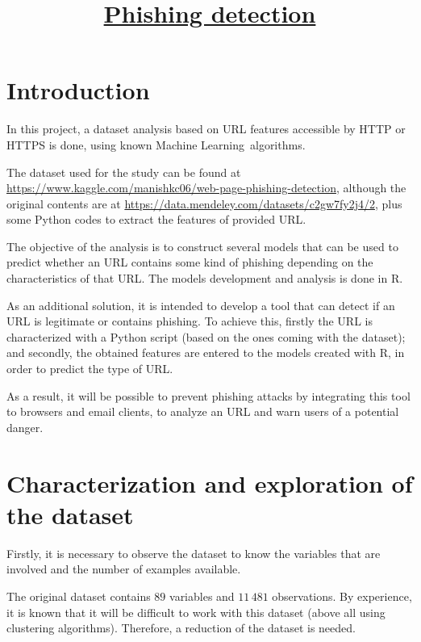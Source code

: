 \documentclass[12pt, a4paper]{article}
\title{\underline{\textbf{Phishing detection}}}
\author{\Author}
\date{\displaydate{date}}
\newcommand*{\ML}{Machine Learning}
\begin{document}
  \vspace{3cm}
  \maketitle

  \newpage
  \tableofcontents

  \newpage
  \listoffigures

  \newpage
  \section*{Introduction}

    In this project, a dataset analysis based on URL features accessible by HTTP or HTTPS is done, using known \ML\ algorithms.

    The dataset used for the study can be found at \url{https://www.kaggle.com/manishkc06/web-page-phishing-detection}, although the original contents are at \url{https://data.mendeley.com/datasets/c2gw7fy2j4/2}, plus some Python codes to extract the features of provided URL.

    The objective of the analysis is to construct several models that can be used to predict whether an URL contains some kind of phishing depending on the characteristics of that URL. The models development and analysis is done in R.

    As an additional solution, it is intended to develop a tool that can detect if an URL is legitimate or contains phishing. To achieve this, firstly the URL is characterized with a Python script (based on the ones coming with the dataset); and secondly, the obtained features are entered to the models created with R, in order to predict the type of URL.

    As a result, it will be possible to prevent phishing attacks by integrating this tool to browsers and email clients, to analyze an URL and warn users of a potential danger.

  \section{Characterization and exploration of the dataset}

    Firstly, it is necessary to observe the dataset to know the variables that are involved and the number of examples available.

    The original dataset contains $89$ variables and $11\,481$ observations. By experience, it is known that it will be difficult to work with this dataset (above all using clustering algorithms). Therefore, a reduction of the dataset is needed.
\end{document}
